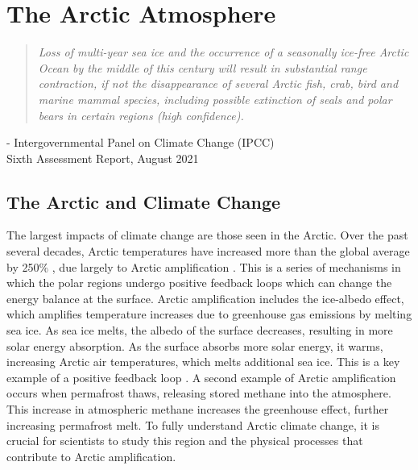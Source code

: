 \chapter{The Arctic Atmosphere}
\vspace{1 cm}
\begin{spacing}{1} \begin{quote} 
\noindent \emph{Loss of multi-year sea ice and the occurrence of a seasonally ice-free Arctic Ocean by the middle of this century will result in substantial range contraction, if not the disappearance of several Arctic fish, crab, bird and marine mammal species, including possible extinction of seals and polar bears in certain regions (high confidence).} \end{quote}
\hspace{6 cm} - Intergovernmental Panel on Climate Change (IPCC) \\
\hspace*{6.7 cm} Sixth Assessment Report, August 2021  
\end{spacing}
\vspace{1 cm}

\section{The Arctic and Climate Change}
The largest impacts of climate change are those seen in the Arctic. Over the past several decades, Arctic temperatures have increased more than the global average by 250$\%$ \citep{tjernstrom:2014a}, due largely to Arctic amplification \citep{rantanen:2022}. This is a series of mechanisms in which the polar regions undergo positive feedback loops which can change the energy balance at the surface. Arctic amplification includes the ice-albedo effect, which amplifies temperature increases due to greenhouse gas emissions by melting sea ice. As sea ice melts, the albedo of the surface decreases, resulting in more solar energy absorption. As the surface absorbs more solar energy, it warms, increasing Arctic air temperatures, which melts additional sea ice. This is a key example of a positive feedback loop \citep{ipcc_techsum}. A second example of Arctic amplification occurs when permafrost thaws, releasing stored methane into the atmosphere. This increase in atmospheric methane increases the greenhouse effect, further increasing permafrost melt. To fully understand Arctic climate change, it is crucial for scientists to study this region and the physical processes that contribute to Arctic amplification.

